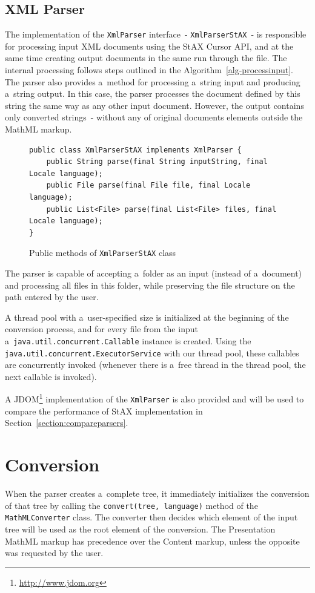 \documentclass[11pt,oneside,final]{fithesis2}
\begin{document}
\subsection{XML Parser}
The implementation of the \texttt{XmlParser} interface~- \texttt{XmlParserStAX}~- is responsible for processing input XML documents using the StAX Cursor API, and at the same time creating output documents in the same run through the file. The internal processing follows steps outlined in the Algorithm~\ref{alg-processinput}. The parser also provides a~method for processing a~string input and producing a~string output. In this case, the parser processes the document defined by this string the same way as any other input document. However, the output contains only converted strings~- without any of original documents elements outside the MathML markup.
\begin{figure}[!ht]
\begin{lstlisting}
public class XmlParserStAX implements XmlParser {
	public String parse(final String inputString, final Locale language);
	public File parse(final File file, final Locale language);
	public List<File> parse(final List<File> files, final Locale language);
}
\end{lstlisting}
\caption{Public methods of \texttt{XmlParserStAX} class}
\label{fig:xmlparserstax}
\end{figure}

The parser is capable of accepting a~folder as an input (instead of a~document) and processing all files in this folder, while preserving the file structure on the path entered by the user. 

A thread pool with a~user-specified size is initialized at the beginning of the conversion process, and for every file from the input a~\texttt{java.util.concurrent.Callable} instance is created. Using the \texttt{java.util.concurrent.ExecutorService} with our thread pool, these callables are concurrently invoked (whenever there is a~free thread in the thread pool, the next callable is invoked). 

A JDOM\footnote{\url{http://www.jdom.org}} implementation of the \texttt{XmlParser} is also provided and will be used to compare the performance of StAX implementation in Section~\ref{section:compareparsers}.

\section{Conversion}
When the parser creates a~complete tree, it immediately initializes the conversion of that tree by calling the \texttt{convert(tree, language)} method of the \texttt{MathMLConverter} class. The converter then decides which element of the input tree will be used as the root element of the conversion. The Presentation MathML markup has precedence over the Content markup, unless the opposite was requested by the user.
\end{document}
